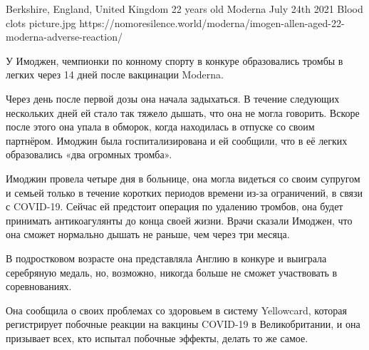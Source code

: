 {Berkshire, England, United Kingdom}
{22 years old}
{Moderna}
{July 24th 2021}
{Blood clots}
{picture.jpg}
{https://nomoresilence.world/moderna/imogen-allen-aged-22-moderna-adverse-reaction/}
{

У Имоджен, чемпионки по конному спорту в конкуре образовались тромбы в легких
через 14 дней после вакцинации Moderna.

Через день после первой дозы она начала задыхаться. В течение следующих
нескольких дней ей стало так тяжело дышать, что она не могла говорить. Вскоре
после этого она упала в обморок, когда находилась в отпуске со своим
партнёром. Имоджин была госпитализирована и ей сообщили, что в её легких
образовались «два огромных тромба».

Имоджин провела четыре дня в больнице, она могла видеться со своим супругом и
семьей только в течение коротких периодов времени из-за ограничений, в связи с
COVID-19. Сейчас ей предстоит операция по удалению тромбов, она будет принимать
антикоагулянты до конца своей жизни. Врачи сказали Имоджен, что она сможет
нормально дышать не раньше, чем через три месяца.

В подростковом возрасте она представляла Англию в конкуре и выиграла серебряную
медаль, но, возможно, никогда больше не сможет участвовать в соревнованиях.

Она сообщила о своих проблемах со здоровьем в систему Yellowcard, которая
регистрирует побочные реакции на вакцины COVID-19 в Великобритании, и она
призывает всех, кто испытал побочные эффекты, делать то же самое.

}
